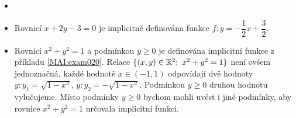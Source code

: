 \wikitextrule
\begin{example}\label{MAI:exam022}
  \begin{itemize}
  \item[]
  \item  Rovnicí $x+2y-3=0$ je implicitně definována funkce  
         $f:y=-\dfrac{1}{2}x+\dfrac{3}{2}$.
  \item  Rovnicí $x^2+y^2=1$ a podmínkou $y\geq0$ je definována implicitní funkce z příkladu 
         \ref{MAI:exam020}. Relace $\{(x,y)\in\mathbb{R}^2;\ x^2+y^2=1\}$ není ovšem jednoznačná, 
         každé hodnotě $x\in(-1,1)$ odpovídají dvě hodnoty $y: y_1=\sqrt{1-x^2}$, $y: y_2 = 
         -\sqrt{1-x^2}$. Podmínkou $y\geq0$ druhou hodnotu vylučujeme. Místo podmínky $y\geq0$ 
         bychom mohli uvést i jiné podmínky, aby rovnice $x^2+y^2=1$ určovala implicitní funkci.   
  \end{itemize}
\end{example}